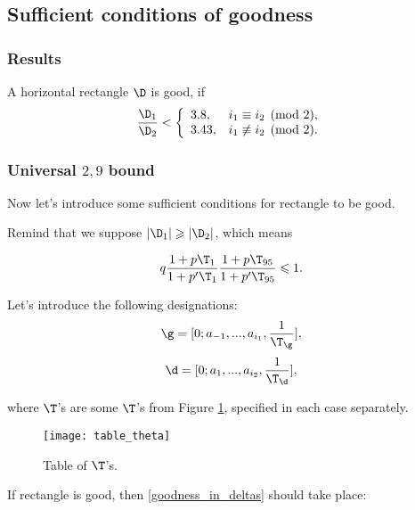 \subsection{Sufficient conditions of goodness}

\subsubsection{Results}

A horizontal rectangle $\D$ is good, if
\begin{equation}\label{goodness_condition}
	\dfrac{\D_1}{\D_2} <
	\left\{\begin{array}{ll}
		3.8, & i_1 \equiv i_2 \pmod 2,\\
		3.43, & i_1 \not\equiv i_2 \pmod 2.
	\end{array}\right.
\end{equation}

\subsubsection{Universal $2,9$ bound}

Now let's introduce some sufficient conditions for rectangle to be good.


Remind that we suppose $|\D_1| \geqslant |\D_2|$, which means

\begin{equation*}
	q
	\dfrac{1 + p \T_{1}}{1 + p' \T_{1}}
	\dfrac{1 + p \T_{95}}{1 + p' \T_{95}} \leqslant 1.
\end{equation*}

Let's introduce the following designations:
\begin{equation*}
	\g = [0; a_{-1}, ..., a_{i_1}, \frac{1}{\T_\g}],
\end{equation*}
\begin{equation*}
	\d = [0; a_{1}, ..., a_{i_2}, \frac{1}{\T_\d}],
\end{equation*}

where $\T$'s are some $\T$'s from Figure \ref{table_theta},
specified in each case separately.

\begin{figure}[p]
	\texttt{[image: table\_theta]}
	\caption{Table of $\T$'s.}
	\label{table_theta}
\end{figure}

If rectangle is good, then \ref{goodness_in_deltas} should take place:

